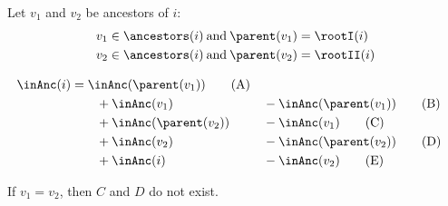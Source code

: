 Let $v_1$ and $v_2$ be ancestors of $i$:
\begin{align*}
	v_1 \in \ancestors(i) &\booland \parent(v_1) = \rootI(i) \\
	v_2 \in \ancestors(i) &\booland \parent(v_2) = \rootII(i)
\end{align*}

\begin{alignat}{2}
	\inAnc(i) &= \inAnc(\parent(v_1)) \tag{A}\\
	&\qquad + \inAnc(v_1) &&- \inAnc(\parent(v_1)) \tag{B}\\
	&\qquad + \inAnc(\parent(v_2)) &&- \inAnc(v_1) \tag{C}\\
	&\qquad + \inAnc(v_2) &&- \inAnc(\parent(v_2)) \tag{D}\\
	&\qquad + \inAnc(i) &&- \inAnc(v_2) \tag{E}
\end{alignat}

If $v_1 = v_2$, then $C$ and $D$ do not exist.

